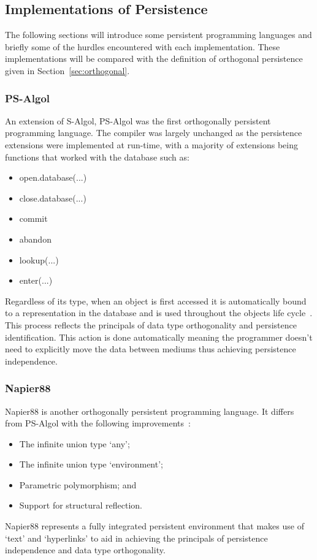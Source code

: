 \documentclass[a4paper,12pt]{article}
\begin{document}
\subsection{Implementations of Persistence}\label{sec:persistentLanguages}
The following sections will introduce some persistent programming languages and briefly some of the hurdles encountered with each implementation. These implementations will be compared with the definition of orthogonal persistence given in Section~\ref{sec:orthogonal}.
\subsubsection{PS-Algol}
An extension of S-Algol, PS-Algol was the first orthogonally persistent programming language. The compiler was largely unchanged as the persistence extensions were implemented at run-time, with a majority of extensions being functions that worked with the database such as:
\begin{itemize}
    \item{open.database(...)}
    \item{close.database(...)}
    \item{commit}
    \item{abandon}
    \item{lookup(...)}
    \item{enter(...)}
\end{itemize}
Regardless of its type, when an object is first accessed it is automatically bound to a representation in the database and is used throughout the objects life cycle~\citep{psalgol}. This process reflects the principals of data type orthogonality and persistence identification. This action is done automatically meaning the programmer doesn't need to explicitly move the data between mediums thus achieving persistence independence.
\subsubsection{Napier88}
Napier88 is another orthogonally persistent programming language\citep{napier}. It differs from PS-Algol with the following improvements~\citep{ADearle}:
\begin{itemize}
    \item{The infinite union type `any';}
    \item{The infinite union type `environment';} 
    \item{Parametric polymorphism; and}
    \item{Support for structural reflection.}
\end{itemize}
Napier88 represents a fully integrated persistent environment that makes use of `text' and `hyperlinks' to aid in achieving the principals of persistence independence and data type orthogonality.
\end{document}
